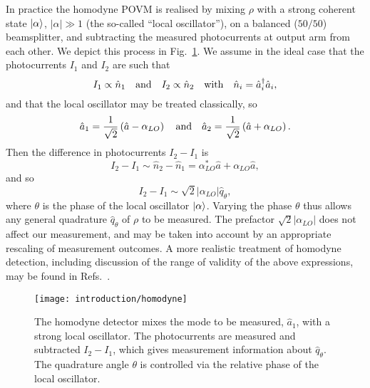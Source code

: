 In practice the homodyne POVM is realised by mixing $\rho$ with a strong coherent state $\ket{\alpha}$, $\left|\alpha\right| \gg 1$ (the so-called ``local oscillator''), on a balanced ($50/50$) beamsplitter, and subtracting the measured photocurrents at output arm from each other. We depict this process in Fig.~\ref{fig:intro_homodyne}. We assume in the ideal case that the photocurrents $I_1$ and $I_2$ are such that
\begin{equation}
I_1 \propto \hat{n}_1 \qq{and} I_2 \propto \hat{n}_2 \qq{with} \hat{n}_i = \hat{a}_i^\dagger \hat{a}_i,
\end{equation}
and that the local oscillator may be treated classically, so
\begin{equation}
\hat{a}_1 = \frac{1}{\sqrt{2}} \left(\hat{a} - \alpha_{LO}\right) \qq{and} \hat{a}_2 = \frac{1}{\sqrt{2}}\left(\hat{a} + \alpha_{LO}\right).
\end{equation}
Then the difference in photocurrents $I_2 - I_1$ is
\begin{equation}
I_2 - I_1 \sim \hat{n}_2 - \hat{n}_1 = \alpha_{LO}^* \hat{a} + \alpha_{LO}\hat{a},
\end{equation}
and so
\begin{equation}
I_2 - I_1 \sim \sqrt{2} \left|\alpha_{LO}\right| \hat{q}_\theta,
\end{equation}
where $\theta$ is the phase of the local oscillator $\ket{\alpha}$. Varying the phase $\theta$ thus allows any general quadrature $\hat{q}_\theta$ of $\rho$ to be measured. The prefactor $\sqrt{2}\left|\alpha_{LO}\right|$ does not affect our measurement, and may be taken into account by an appropriate rescaling of measurement outcomes. A more realistic treatment of homodyne detection, including discussion of the range of validity of the above expressions, may be found in Refs.~\cite{Leonhardt1998, Serafini2017}.


\begin{figure}[htp]
\centering
\captionsetup{width=0.8\linewidth}
\texttt{[image: introduction/homodyne]}
\caption{\label{fig:intro_homodyne} The homodyne detector mixes the mode to be measured, $\hat{a}_1$, with a strong local oscillator. The photocurrents are measured and subtracted $I_2 - I_1$, which gives measurement information about $\hat{q}_\theta$. The quadrature angle $\theta$ is controlled via the relative phase of the local oscillator.}
\end{figure}



